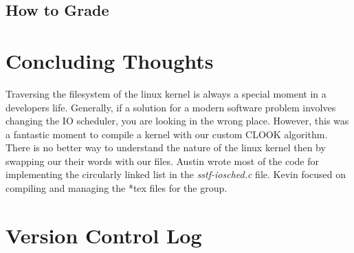 \documentclass[onecolumn, draftclsnofoot,10pt, compsoc]{IEEEtran}
\begin{document}
        \subsection{How to Grade}
        
        \section{Concluding Thoughts}
        Traversing the filesystem of the linux kernel is always a special moment in a developers life. Generally, if a solution for a modern software problem involves changing the IO scheduler, you are looking in the wrong place. However, this was a fantastic moment to compile a kernel with our custom CLOOK algorithm. There is no better way to understand the nature of the linux kernel then by swapping our their words with our files. Austin wrote most of the code for implementing the circularly linked list in the \textit{sstf-iosched.c} file. Kevin focused on compiling and managing the *tex files for the group. 
        \section{Version Control Log}
        
\end{document}
